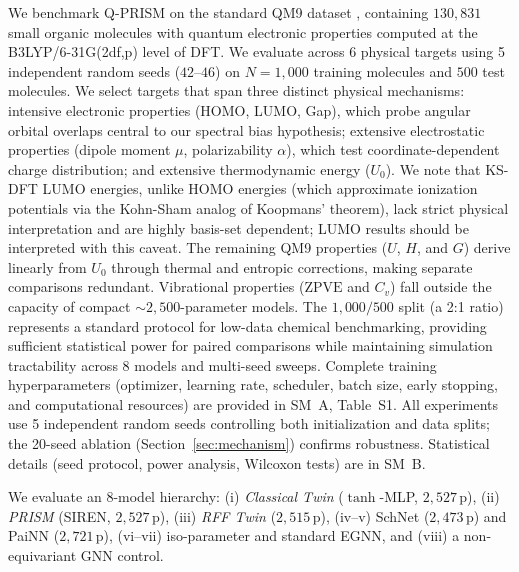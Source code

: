 \documentclass[10pt,twocolumn,letterpaper]{article}
\begin{document}
We benchmark Q-PRISM on the standard QM9 dataset \cite{ramakrishnan2014quantum}, containing $130{,}831$ small organic molecules with quantum electronic properties computed at the B3LYP/6-31G(2df,p) level of DFT.
We evaluate across 6 physical targets using 5 independent random seeds ($42$--$46$) on $N = 1{,}000$ training molecules and $500$ test molecules.
We select targets that span three distinct physical mechanisms: intensive electronic properties (HOMO, LUMO, Gap), which probe angular orbital overlaps central to our spectral bias hypothesis; extensive electrostatic properties (dipole moment $\mu$, polarizability $\alpha$), which test coordinate-dependent charge distribution; and extensive thermodynamic energy ($U_0$). We note that KS-DFT LUMO energies, unlike HOMO energies (which approximate ionization potentials via the Kohn-Sham analog of Koopmans' theorem), lack strict physical interpretation and are highly basis-set dependent; LUMO results should be interpreted with this caveat. The remaining QM9 properties ($U$, $H$, and $G$) derive linearly from $U_0$ through thermal and entropic corrections, making separate comparisons redundant. Vibrational properties ($\text{ZPVE}$ and $C_v$) fall outside the capacity of compact $\sim 2{,}500$-parameter models.
The $1{,}000 / 500$ split (a 2:1 ratio) represents a standard protocol for low-data chemical benchmarking, providing sufficient statistical power for paired comparisons while maintaining simulation tractability across 8 models and multi-seed sweeps.
Complete training hyperparameters (optimizer, learning rate, scheduler, batch size, early stopping, and computational resources) are provided in SM~A, Table~S1.
All experiments use 5 independent random seeds controlling both initialization and data splits; the 20-seed ablation (Section~\ref{sec:mechanism}) confirms robustness. Statistical details (seed protocol, power analysis, Wilcoxon tests) are in SM~B.

We evaluate an 8-model hierarchy: (i) \textit{Classical Twin} ($\tanh$-MLP, $2{,}527$\,p), (ii) \textit{PRISM} (SIREN, $2{,}527$\,p), (iii) \textit{RFF Twin} ($2{,}515$\,p), (iv--v) SchNet ($2{,}473$\,p) and PaiNN ($2{,}721$\,p), (vi--vii) iso-parameter and standard EGNN, and (viii) a non-equivariant GNN control.
\end{document}
